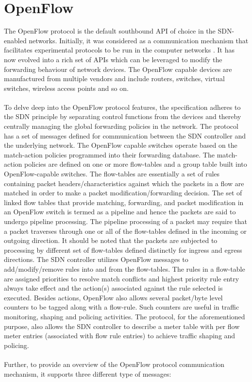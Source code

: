 \section{OpenFlow}
The OpenFlow protocol is the default southbound API of choice in the SDN-enabled networks. Initially, it was considered as a communication mechanism that facilitates experimental protocols to be run in the computer networks \cite{OpenFlow-White-Paper}. It has now evolved into a rich set of APIs which can be leveraged to modify the forwarding behaviour of network devices. The OpenFlow capable devices are manufactured from multiple vendors and include routers, switches, virtual switches, wireless access points\cite{OFArchive} and so on. \\\\To delve deep into the OpenFlow protocol features, the specification adheres to the SDN principle by separating control functions from the devices and thereby centrally managing the global forwarding policies in the network. The protocol has a set of messages defined for communication between the SDN controller and the underlying network. The OpenFlow capable switches operate based on the match-action policies programmed into their forwarding database. The match-action policies are defined on one or more flow-tables and a group table built into OpenFlow-capable switches. The flow-tables are essentially a set of rules containing packet headers/characteristics against which the packets in a flow are matched in order to make a packet modification/forwarding decision. The set of linked flow tables that provide matching, forwarding, and packet modification in an OpenFlow switch is termed as a pipeline \cite{OFSwitchSpecification} and hence the packets are said to undergo pipeline processing.  The pipeline processing of a packet may require that a packet traverses through one or all of the flow-tables defined in the incoming or outgoing direction. It should be noted that the packets are subjected to processing by different set of flow-tables defined distinctly for ingress and egress directions. The SDN controller utilizes OpenFlow messages to add/modify/remove rules into and from the flow-tables.
The rules in a flow-table are assigned priorities to resolve match conflicts and highest priority rule entry always take effect and the action(s) associated against the rule selected is executed. Besides actions, OpenFlow also allows several packet/byte level counters to be tagged along with a flow-rule. Such counters are useful in traffic monitoring, shaping and policing activities. The protocol, for the aforementioned purpose, also allows the SDN controller to describe a meter table with per flow meter entries (associated with flow rule entries) to achieve traffic shaping and policing. \\\\ Further, to provide an overview of the OpenFlow protocol communication mechanism, it supports three different type of messages:
